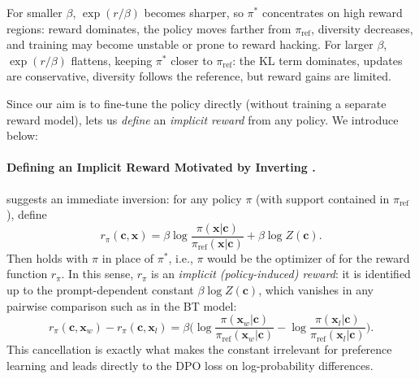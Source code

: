 For smaller $\beta$, $\exp(r/\beta)$ becomes sharper, so $\pi^*$ concentrates on high reward regions: reward dominates, the policy moves farther from $\pi_{\mathrm{ref}}$, diversity decreases, and training may become unstable or prone to reward hacking. For larger $\beta$, $\exp(r/\beta)$ flattens, keeping $\pi^*$ closer to $\pi_{\mathrm{ref}}$: the KL term dominates, updates are conservative, diversity follows the reference, but reward gains are limited.

Since our aim is to fine-tune the policy directly (without training a separate reward model),  lets us \emph{define} an \textit{implicit reward} from any policy. We introduce below:
\paragraph{Defining an Implicit Reward Motivated by Inverting .}
 suggests an immediate inversion: for any policy $\pi$ (with support contained in $\pi_{\mathrm{ref}}$), define
\begin{equation}\label{eq:implicit-reward}
r_{\pi}(\mathbf c,\mathbf x)
 = 
\beta \log\frac{\pi(\mathbf x|\mathbf c)}{\pi_{\mathrm{ref}}(\mathbf x|\mathbf c)}
 + \beta \log Z(\mathbf c).
\end{equation}
Then  holds with $\pi$ in place of $\pi^*$, i.e., $\pi$ would be the optimizer of  for the reward function $r_{\pi}$.
In this sense, $r_{\pi}$ is an \emph{implicit (policy-induced) reward}: it is identified up to the prompt-dependent constant $\beta\log Z(\mathbf c)$, which vanishes in any pairwise comparison such as in the BT model:
\[
r_{\pi}(\mathbf c,\mathbf x_w)-r_{\pi}(\mathbf c,\mathbf x_l)
=
\beta\Big(
\log\frac{\pi(\mathbf x_w|\mathbf c)}{\pi_{\mathrm{ref}}(\mathbf x_w|\mathbf c)}
-
\log\frac{\pi(\mathbf x_l|\mathbf c)}{\pi_{\mathrm{ref}}(\mathbf x_l|\mathbf c)}
\Big).
\]
This cancellation is exactly what makes the constant irrelevant for preference learning and leads directly to the DPO loss on log-probability differences.

